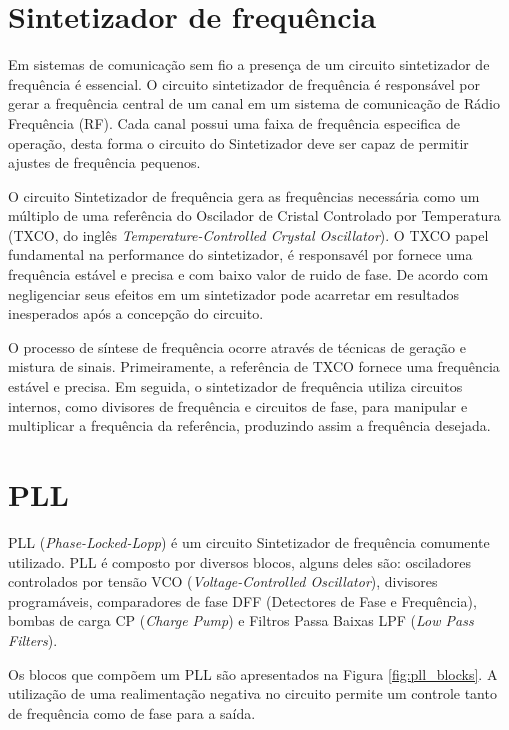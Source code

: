 \section{Sintetizador de frequência}
Em sistemas de comunicação sem fio a presença de um circuito sintetizador de frequência é essencial. O circuito sintetizador de frequência é responsável por gerar a frequência central de um canal em um sistema de comunicação de Rádio Frequência (RF). Cada canal possui uma faixa de frequência especifica de operação, desta forma o circuito do Sintetizador deve ser capaz de permitir ajustes de frequência pequenos.

O circuito Sintetizador de frequência gera as frequências necessária como um múltiplo de uma referência do Oscilador de Cristal Controlado por Temperatura (TXCO, do inglês \textit{Temperature-Controlled Crystal Oscillator}). O TXCO papel fundamental na performance do sintetizador, é responsavél por fornece uma frequência estável e precisa e com baixo valor de ruido de fase. De acordo com \cite{lascari2000accurate} negligenciar seus efeitos em um sintetizador pode acarretar em resultados inesperados após a concepção do circuito.

O processo de síntese de frequência ocorre através de técnicas de geração e mistura de sinais. Primeiramente, a referência de TXCO fornece uma frequência estável e precisa. Em seguida, o sintetizador de frequência utiliza circuitos internos, como divisores de frequência e circuitos de fase, para manipular e multiplicar a frequência da referência, produzindo assim a frequência desejada.


\section{PLL}
PLL (\textit{Phase-Locked-Lopp}) é um circuito Sintetizador de frequência comumente utilizado. PLL é composto por diversos blocos, alguns deles são: osciladores controlados por tensão VCO (\textit{Voltage-Controlled Oscillator}), divisores programáveis, comparadores de fase DFF (Detectores de Fase e Frequência), bombas de carga CP (\textit{Charge Pump}) e Filtros Passa Baixas LPF (\textit{Low Pass Filters}). 

Os blocos que compõem um PLL são apresentados na Figura \ref{fig:pll_blocks}.
A utilização de uma realimentação negativa no circuito permite um controle tanto de frequência como de fase para a saída.


